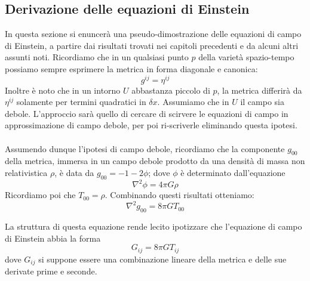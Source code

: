 \documentclass[]{report}
\theoremstyle{definition}
\theoremstyle{Theorem}
\theoremstyle{definition}
\theoremstyle{definition}
\theoremstyle{definition}
\begin{document}
\subsection{Derivazione delle equazioni di Einstein}
In questa sezione si enuncerà una pseudo-dimostrazione delle equazioni di campo di Einstein, a partire dai risultati trovati nei capitoli precedenti e da alcuni altri assunti noti.
Ricordiamo che in un qualsiasi punto $p$ della varietà spazio-tempo possiamo sempre esprimere la metrica in forma diagonale e canonica:
$$g^{ij}=\eta^{ij}$$
Inoltre è noto che in un intorno $U$ abbastanza piccolo di $p$, la metrica differirà da $\eta^{ij}$ solamente per termini quadratici in $\delta x$. Assumiamo che in $U$ il campo sia debole. L'approccio sarà quello di cercare di scirvere le equazioni di campo in approssimazione di campo debole, per poi ri-scriverle eliminando questa ipotesi.\\
\\
Assumendo dunque l'ipotesi di campo debole, ricordiamo che la componente $g_{00}$ della metrica, immersa in un campo debole prodotto da una densità di massa non relativistica $\rho$, è data da $g_{00}=-1-2\phi$; dove $\phi$ è determinato dall'equazione $$\nabla^2\phi=4\pi G\rho$$
Ricordiamo poi che $T_{00}=\rho$. Combinando questi risultati otteniamo:
\begin{equation}\label{Equation 1}
	\nabla^2g_{00}=8\pi GT_{00}
\end{equation}

La struttura di questa equazione rende lecito ipotizzare che l'equazione di campo di Einstein abbia la forma 
$$G_{ij}=8\pi GT_{ij}$$
dove $G_{ij}$ si suppone essere una combinazione lineare della metrica e delle sue derivate prime e seconde.
\end{document}
